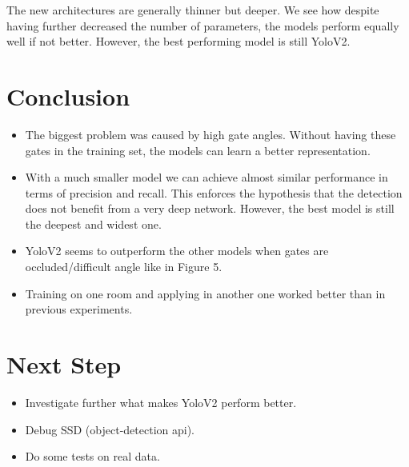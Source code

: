 \documentclass{article}
\begin{document}
The new architectures are generally thinner but deeper. We see how despite having further decreased the number of parameters, the models perform equally well if not better. However, the best performing model is still YoloV2.

\section{Conclusion}

\begin{itemize}
	\item The biggest problem was caused by high gate angles. Without having these gates in the training set, the models can learn a better representation.
	\item With a much smaller model we can achieve almost similar performance in terms of precision and recall. This enforces the hypothesis that the detection does not benefit from a very deep network. However, the best model is still the deepest and widest one.
	\item YoloV2 seems to outperform the other models when gates are occluded/difficult angle like in Figure 5.
	\item Training on one room and applying in another one worked better than in previous experiments.
\end{itemize}

\section{Next Step}
\begin{itemize}
	\item Investigate further what makes YoloV2 perform better.
	\item Debug SSD (object-detection api).
	\item Do some tests on real data.
\end{itemize}


\end{document}
